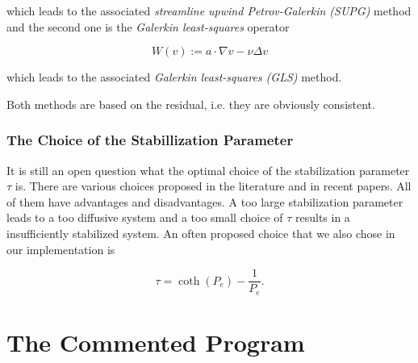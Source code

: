 \documentclass[a4paper, 11pt, twoside]{article}
\begin{document}
which leads to the associated \emph{streamline upwind Petrov-Galerkin (SUPG)} method and the second one is the \emph{Galerkin least-squares} operator

	\begin{equation}\label{GLS}
		W(v) := a \cdot \nabla v - \nu \Delta v
	\end{equation}
	
which leads to the associated \emph{Galerkin least-squares (GLS)} method.

Both methods are based on the residual, i.e. they are obviously consistent.

\subsubsection{The Choice of the Stabillization Parameter}\label{parameter}

It is still an open question what the optimal choice of the stabilization parameter $\tau$ is. There are various choices proposed in the literature and in recent papers. All of them have advantages and disadvantages. A too large stabilization parameter leads to a too diffusive system and a too small choice of $\tau$ results in a insufficiently stabilized system. An often proposed choice that we also chose in our implementation is

	\[\tau = \coth(P_{e}) - \frac{1}{P_{e}}.\]
	
\section{The Commented Program}
\end{document}
